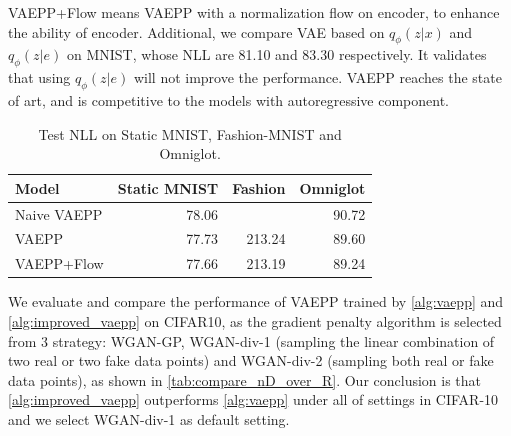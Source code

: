 \begin{table}[tb]
{%
VAEPP+Flow means VAEPP with a normalization flow on encoder, to enhance the ability of encoder. 
Additional, we compare VAE based on $q_\phi(z|x)$ and $q_\phi(z|e)$ on MNIST, whose NLL are 81.10 and 83.30 respectively. It validates that using $q_\phi(z|e)$ will not improve the performance. VAEPP reaches the state of art, and is competitive to the models with autoregressive component. }
\label{tab:mnist-nll}
\end{table}
\begin{table}[tb]
\centering
\begin{tabular}{lrrr}  
\toprule
Model   & Static MNIST & Fashion & Omniglot \\
\midrule
Naive VAEPP    &   78.06   &    &   90.72 \\
VAEPP          &   77.73   &  213.24   &   89.60  \\
VAEPP+Flow     &   77.66   &  213.19  &   89.24  \\
\bottomrule
\end{tabular}
\caption{Test NLL on Static MNIST, Fashion-MNIST and Omniglot.  }
\label{tab:cifar-nll}
\end{table}
We evaluate and compare the performance of VAEPP trained by \cref{alg:vaepp} and \cref{alg:improved_vaepp} on CIFAR10, as the gradient penalty algorithm is selected from 3 strategy: WGAN-GP, WGAN-div-1  (sampling the linear combination of two real or two fake data points) and WGAN-div-2 (sampling both real or fake data points), as shown in \cref{tab:compare_nD_over_R}. Our conclusion is that \cref{alg:improved_vaepp} outperforms \cref{alg:vaepp} under all of settings in CIFAR-10 and we select WGAN-div-1 as default setting.
